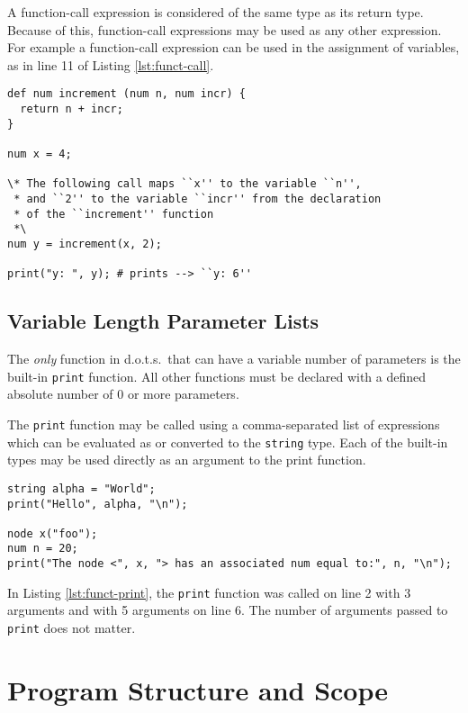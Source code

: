 \documentclass{article}
\newcommand{\pltlang}{d.o.t.s.} %
\newcommand{\code}[1]{\texttt{#1}} %
\begin{document}
A function-call expression is considered of the same type as its return type. Because of this, function-call expressions may be used as any other expression. For example a function-call expression can be used in the assignment of variables, as in line 11 of Listing \ref{lst:funct-call}.

\begin{lstlisting}[language=pltLang, caption=Function declaration and definition., label=lst:funct-call]
def num increment (num n, num incr) {
  return n + incr;
}

num x = 4;

\* The following call maps ``x'' to the variable ``n'',
 * and ``2'' to the variable ``incr'' from the declaration
 * of the ``increment'' function 
 *\
num y = increment(x, 2);

print("y: ", y); # prints --> ``y: 6''
\end{lstlisting}

\subsection{Variable Length Parameter Lists}

The \emph{only} function in \pltlang\ that can have a variable number of parameters is the built-in \code{print} function. All other functions must be declared with a defined absolute number of 0 or more parameters. 

The \code{print} function may be called using a comma-separated list of expressions which can be evaluated as or converted to the \code{string} type. Each of the built-in types may be used directly as an argument to the print function.

\begin{lstlisting}[language=pltLang, caption=The built-in ``print'' function., label=lst:funct-print]
string alpha = "World";
print("Hello", alpha, "\n");

node x("foo");
num n = 20;
print("The node <", x, "> has an associated num equal to:", n, "\n");
\end{lstlisting}

In Listing \ref{lst:funct-print}, the \code{print} function was called on line 2 with 3 arguments and with 5 arguments on line 6. The number of arguments passed to \code{print} does not matter. 

\section{Program Structure and Scope}
\end{document}
